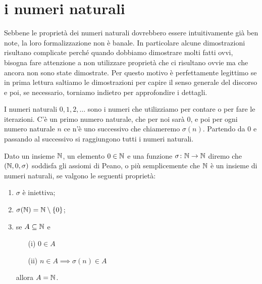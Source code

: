 \section{i numeri naturali}
\label{sec:naturali}

Sebbene le proprietà dei numeri naturali dovrebbero essere intuitivamente già ben note,
la loro formalizzazione non è banale.
In particolare alcune dimostrazioni risultano complicate perché quando dobbiamo dimostrare 
molti fatti ovvi, bisogna fare attenzione a non utilizzare proprietà che ci risultano ovvie 
ma che ancora non sono state dimostrate.
Per questo motivo è perfettamente legittimo se in prima lettura saltiamo le dimostrazioni 
per capire il senso generale del discorso e poi, se necessario, torniamo indietro per
approfondire i dettagli.

I numeri naturali $0,1,2,\dots$ sono i numeri che utilizziamo per contare o per 
fare le iterazioni. C'è un primo numero naturale, che per noi sarà $0$, e poi
per ogni numero naturale $n$ ce n'è uno successivo che chiameremo $\sigma(n)$. 
Partendo da $0$ e passando al successivo si raggiungono tutti i numeri naturali.

\begin{definition}
  \label{def:assiomi_peano}%
  \label{def:naturali}%
  \index{$\NN$}%
Dato un insieme $\NN$, 
un elemento $0\in {\mathbb N}$ 
e una funzione $\sigma\colon {\mathbb N}\to{\mathbb N}$ 
diremo che $({\mathbb N},0,\sigma)$
soddisfa gli assiomi di Peano,
o più semplicemente che $\NN$ è un insieme di numeri naturali,
se valgono le seguenti proprietà: 
\begin{enumerate}
  \item $\sigma$ è iniettiva;
  \item $\sigma({\mathbb N}) = {\mathbb N} \setminus{\left\{ 0 \right\}}$;
  \item se $A\subseteq {\mathbb N}$ e 
  \begin{enumerate} 
    \item[(i)] $0\in A$ 
    \item[(ii)] $n\in A \implies \sigma(n)\in A$
  \end{enumerate}
  allora $A={\mathbb N}$.
\end{enumerate}
\end{definition}

